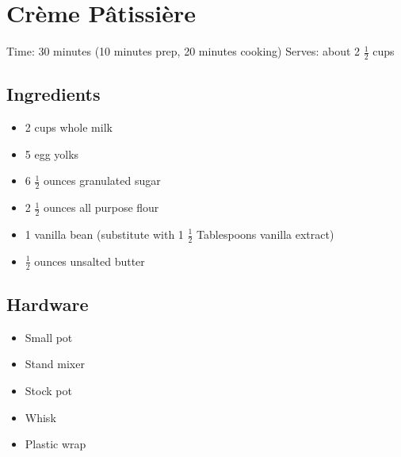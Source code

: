 \section{Crème Pâtissière}
\label{cremePatissiere}
\setcounter{secnumdepth}{0}
Time: 30 minutes (10 minutes prep, 20 minutes cooking)
Serves: about 2 \( \frac{1}{2} \) cups

\begin{multicols}{2}
\subsection*{Ingredients}
\begin{itemize}
    \item 2 cups whole milk
    \item 5 egg yolks
    \item 6 \( \frac{1}{2} \) ounces granulated sugar
    \item 2 \( \frac{1}{2} \) ounces all purpose flour
    \item 1 vanilla bean (substitute with 1 \( \frac{1}{2} \) Tablespoons vanilla extract)
    \item \( \frac{1}{2} \) ounces unsalted butter
\end{itemize}

\subsection*{Hardware}
\begin{itemize}
    \item Small pot
    \item Stand mixer
    \item Stock pot
    \item Whisk
    \item Plastic wrap
\end{itemize}
\clearpage


\end{multicols}

